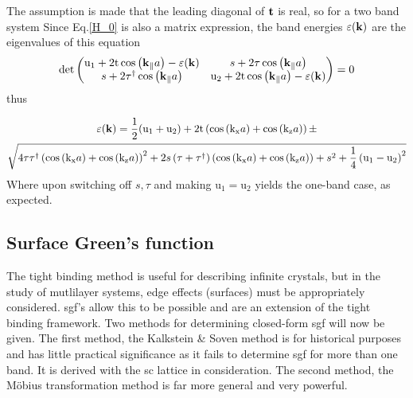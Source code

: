 \documentclass[a4paper, 12pt]{article}
\begin{document}
	The assumption is made that the leading diagonal of $\bf t$ is real, so for a two band system
	Since Eq.\eqref{H_0} is also a matrix expression, the band energies $\varepsilon(\bf k)$ are the eigenvalues of this equation
	\begin{equation}
		\rm det \begin{pmatrix} \rm u_1+2t\cos \left(\bf k_\parallel{\mathnormal a} \right)-\varepsilon(\bf k) &s+2\tau
			\cos \left( {\bf k_\parallel}a \right) \\ s+2
			\tau^\dagger\cos \left({\bf k_\parallel}a \right) &\rm u_2+2t\cos \left( \bf k_\parallel {\mathnormal a}
\right)-\varepsilon(\bf k) \end{pmatrix} =0
	\end{equation}
	thus

	\begin{multline}
		\varepsilon({\bf k}) =\frac{1}{2}(\rm u_1+u_2)+2t\left(\cos \left( k_x{\mathnormal a} \right)+ \cos \left( k_z{\mathnormal a} \right) \right)
 \pm \\\sqrt{\rm { 4 \tau\tau^\dagger\left(\cos \left( k_x{\mathnormal a} \right) +\cos \left( k_z{\mathnormal a} \right)\right)^2
 +2{\mathnormal s}\left(\tau+\tau^\dagger\right)
 \left(\cos \left( k_x\mathnormal a \right)+\cos \left( k_z\mathnormal a \right)\right) +{\mathnormal s}^{2}+\frac{1}{4}\left(u_1 -u_2\right)^2}}
	\end{multline}
	Where upon switching off $s, \tau$ and making u$_1 = $u$_2$ yields the one-band case, as expected.
	

	\subsection{Surface Green's function}
	The tight binding method is useful for describing infinite crystals, but in the study of mutlilayer systems, edge effects (surfaces) must be appropriately considered.
	\gls{sgf}'s allow this to be possible and are an extension of the tight binding framework.
	Two methods for determining closed-form \gls{sgf} will now be given. The first method, the Kalkstein \& Soven method is for historical purposes and has little practical significance as it fails to determine \gls{sgf} for more than one band. It is derived with the \gls{sc} lattice in consideration. The second method, the M\"{o}bius transformation method is far more general and very powerful.
\end{document}

